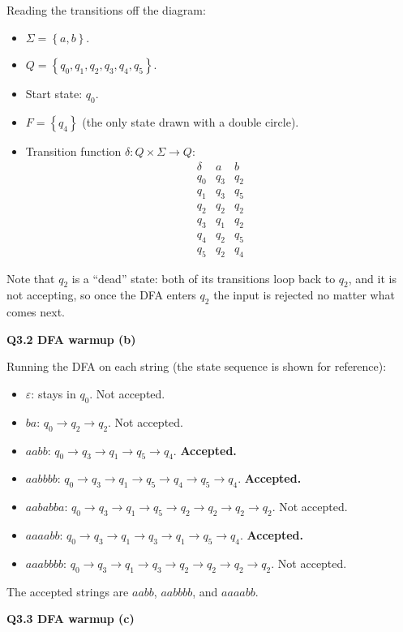 \documentclass[11pt]{article}
\newcommand{\set}[1]{\left\{#1\right\}}
\newcommand{\qpage}[1]{\clearpage\noindent\textbf{\large #1}\par\medskip}
\begin{document}
Reading the transitions off the diagram:
\begin{itemize}
  \item $\Sigma = \set{a, b}$.
  \item $Q = \set{q_0, q_1, q_2, q_3, q_4, q_5}$.
  \item Start state: $q_0$.
  \item $F = \set{q_4}$ (the only state drawn with a double circle).
  \item Transition function $\delta : Q \times \Sigma \to Q$:
  \[
    \begin{array}{c|cc}
      \delta & a & b \\ \hline
      q_0 & q_3 & q_2 \\
      q_1 & q_3 & q_5 \\
      q_2 & q_2 & q_2 \\
      q_3 & q_1 & q_2 \\
      q_4 & q_2 & q_5 \\
      q_5 & q_2 & q_4
    \end{array}
  \]
\end{itemize}
Note that $q_2$ is a ``dead'' state: both of its transitions loop back to $q_2$, and it is not accepting, so once the DFA enters $q_2$ the input is rejected no matter what comes next.

\qpage{Q3.2 DFA warmup (b)}

Running the DFA on each string (the state sequence is shown for reference):
\begin{itemize}
  \item $\varepsilon$: stays in $q_0$. Not accepted.
  \item $ba$: $q_0 \to q_2 \to q_2$. Not accepted.
  \item $aabb$: $q_0 \to q_3 \to q_1 \to q_5 \to q_4$. \textbf{Accepted.}
  \item $aabbbb$: $q_0 \to q_3 \to q_1 \to q_5 \to q_4 \to q_5 \to q_4$. \textbf{Accepted.}
  \item $aababba$: $q_0 \to q_3 \to q_1 \to q_5 \to q_2 \to q_2 \to q_2 \to q_2$. Not accepted.
  \item $aaaabb$: $q_0 \to q_3 \to q_1 \to q_3 \to q_1 \to q_5 \to q_4$. \textbf{Accepted.}
  \item $aaabbbb$: $q_0 \to q_3 \to q_1 \to q_3 \to q_2 \to q_2 \to q_2 \to q_2$. Not accepted.
\end{itemize}
The accepted strings are $aabb$, $aabbbb$, and $aaaabb$.

\qpage{Q3.3 DFA warmup (c)}
\end{document}
